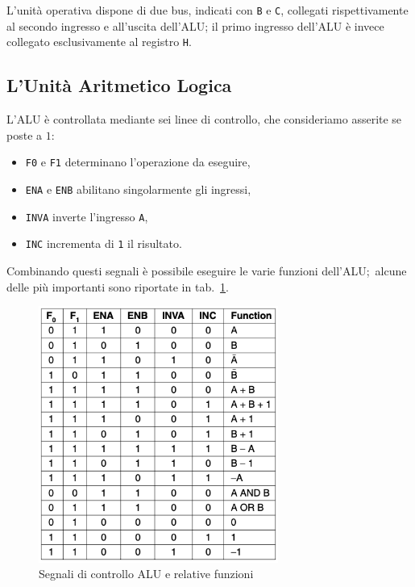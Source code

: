\documentclass[a4paper,12pt]{scrreprt}
\begin{document}
L'unità operativa dispone di due bus, indicati con \lstinline{B} e
\lstinline{C}, collegati rispettivamente al secondo ingresso e all'uscita
dell'ALU; il primo ingresso dell'ALU è invece collegato esclusivamente al
registro \lstinline{H}.

\subsection{L'Unità Aritmetico Logica}

L'ALU è controllata mediante sei linee di controllo, che consideriamo asserite
se poste a $1$:
\begin{itemize}
  \item \lstinline{F0} e \lstinline{F1} determinano l'operazione da eseguire,
  \item \lstinline{ENA} e \lstinline{ENB} abilitano singolarmente gli ingressi,
  \item \lstinline{INVA} inverte l'ingresso \lstinline{A},
  \item \lstinline{INC} incrementa di \lstinline{1} il risultato.
\end{itemize}

Combinando questi segnali è possibile eseguire le varie funzioni
dell'ALU;~alcune delle più importanti sono riportate in tab.~\ref{fig:alu_func}.

\begin{figure}
  \centering
  \includegraphics[width=0.7\textwidth]{alu_func.png}
  \caption{Segnali di controllo ALU e relative funzioni}\label{fig:alu_func}
\end{figure}
\end{document}
